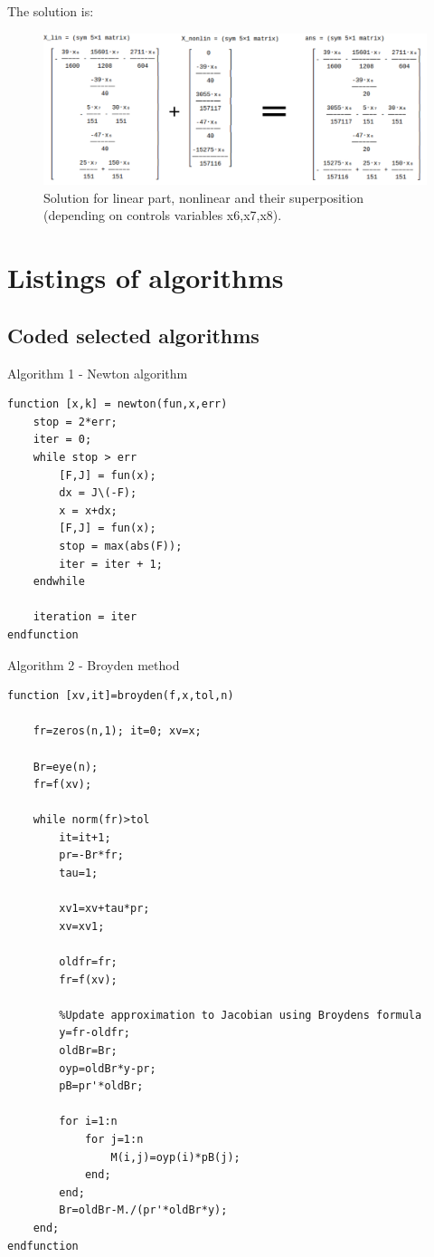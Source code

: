 \documentclass[eng,openany]{mgr}
\begin{document}
\newpage
The solution is:
\begin{figure}[h]
\centering
\includegraphics[width=1\linewidth]{screenshot017}
\caption{Solution for linear part, nonlinear and their superposition (depending on controls variables x6,x7,x8).}
\label{fig:screenshot017}
\end{figure}









\clearpage
\chapter{Listings of algorithms}
\section{Coded selected algorithms}
Algorithm 1 - Newton algorithm\\ 
\begin{lstlisting}
function [x,k] = newton(fun,x,err)
	stop = 2*err;
	iter = 0;
	while stop > err
		[F,J] = fun(x);
		dx = J\(-F);
		x = x+dx;
		[F,J] = fun(x);
		stop = max(abs(F));
		iter = iter + 1;
	endwhile
	
	iteration = iter
endfunction
\end{lstlisting}
\newpage
Algorithm 2 - Broyden method\\
\begin{lstlisting}
function [xv,it]=broyden(f,x,tol,n)
	
	fr=zeros(n,1); it=0; xv=x;
	
	Br=eye(n);
	fr=f(xv);
	
	while norm(fr)>tol
		it=it+1;
		pr=-Br*fr;
		tau=1;
		
		xv1=xv+tau*pr; 
		xv=xv1;
		
		oldfr=fr; 
		fr=f(xv);
		
		%Update approximation to Jacobian using Broydens formula
		y=fr-oldfr; 
		oldBr=Br;
		oyp=oldBr*y-pr; 
		pB=pr'*oldBr;
		
		for i=1:n
			for j=1:n
				M(i,j)=oyp(i)*pB(j);
			end;
		end;
		Br=oldBr-M./(pr'*oldBr*y);
	end;
endfunction
\end{lstlisting}
\end{document}
